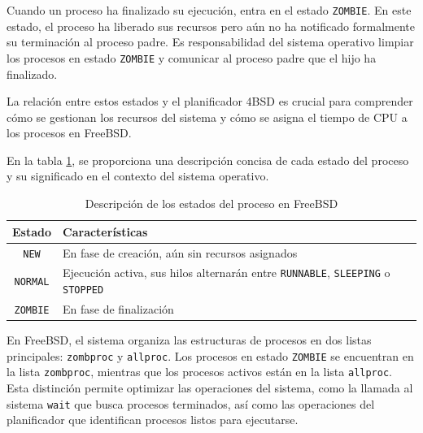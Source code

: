 Cuando un proceso ha finalizado su ejecución, entra en el estado \texttt{ZOMBIE}. En este estado, el proceso ha liberado sus recursos pero aún no ha notificado formalmente su terminación al proceso padre. Es responsabilidad del sistema operativo limpiar los procesos en estado \texttt{ZOMBIE} y comunicar al proceso padre que el hijo ha finalizado.

La relación entre estos estados y el planificador 4BSD es crucial para comprender cómo se gestionan los recursos del sistema y cómo se asigna el tiempo de CPU a los procesos en FreeBSD.

En la tabla \ref{tabla:estados-proceso}, se proporciona una descripción concisa de cada estado del proceso y su significado en el contexto del sistema operativo.

\begin{table}[H]
    \centering
    \begin{tabular}{|c|p{}|}
        \hline
        \textbf{Estado} & \textbf{Características}                                                                             \\
        \hline
        \texttt{NEW}    & En fase de creación, aún sin recursos asignados                                                      \\
        \hline
        \texttt{NORMAL} & Ejecución activa, sus hilos alternarán entre \texttt{RUNNABLE}, \texttt{SLEEPING} o \texttt{STOPPED} \\
        \hline
        \texttt{ZOMBIE} & En fase de finalización                                                                              \\
        \hline
    \end{tabular}
    \caption{Descripción de los estados del proceso en FreeBSD}
    \label{tabla:estados-proceso}
\end{table}

En FreeBSD, el sistema organiza las estructuras de procesos en dos listas principales: \texttt{zombproc} y \texttt{allproc}. Los procesos en estado \texttt{ZOMBIE} se encuentran en la lista \texttt{zombproc}, mientras que los procesos activos están en la lista \texttt{allproc}. Esta distinción permite optimizar las operaciones del sistema, como la llamada al sistema \texttt{wait} que busca procesos terminados, así como las operaciones del planificador que identifican procesos listos para ejecutarse.

